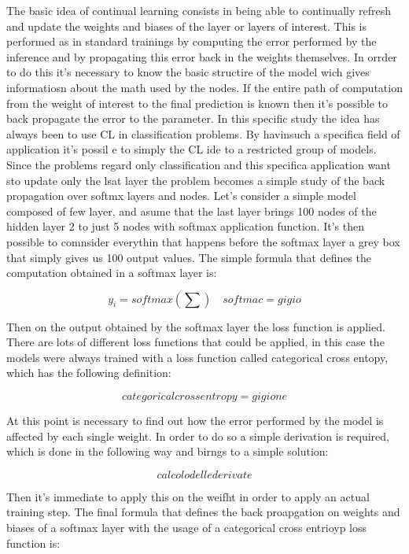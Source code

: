 \documentclass[12pt]{report}
\begin{document}
The basic idea of continual learning consists in being able to continually refresh and update the weights and biases of the layer or layers of interest. This is performed as in standard trainings by computing the error performed by the inference and by propagating this error back in the weights themselves. In orrder to do this it's necessary to know the basic structire of the model wich gives informatiosn about the math used by the nodes. If the entire path of computation from the weight of interest to the final prediction is known then it's possible to back propagate the error to the parameter. In this specific study the idea has always been to use CL in classification problems. By havinsuch a specifica field of application it's possil e to simply the CL ide to a restricted group of models. Since the problems regard only classification and this specifica application want sto update only the lsat layer the problem becomes a simple study of the back propagation over softmx layers and nodes. Let's consider a simple model composed of few layer, and asume that the last layer brings 100 nodes of the hidden layer 2 to just 5 nodes with softmax application function. It's then possible to comnsider everythin that happens before the softmax layer a grey box that simply gives us 100 output values. The simple formula that defines the computation obtained in a softmax layer is:

\begin{equation}
y_i = softmax(\sum ) \quad softmac = gigio
\end{equation}

Then on the output obtained by the softmax layer the loss function is applied. There are lots of different loss functions that could be applied, in this case the models were always trained with a loss function called categorical cross entopy, which has the following definition:

\begin{equation}
categorical cross entropy = gigione
\end{equation}

At this point is necessary to find out how the error performed by the model is affected by each single weight. In order to do so a simple derivation is required, which is done in the following way and birngs to a simple solution:

\begin{equation}
calcolo delle derivate
\end{equation}

Then it's immediate to apply this on the weifht in order to apply an actual training step. The final formula that defines the back proapgation on weights and biases of a softmax layer with the usage of a categorical cross entrioyp loss function is:
\end{document}
